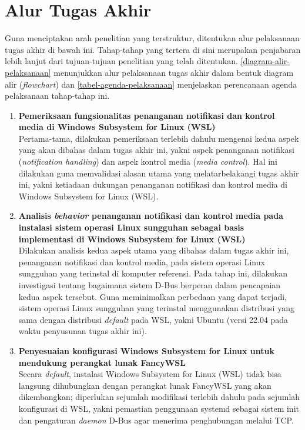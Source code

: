 \section{Alur Tugas Akhir}

Guna menciptakan arah penelitian yang terstruktur, ditentukan alur pelaksanaan tugas akhir di bawah ini. Tahap-tahap yang tertera di sini merupakan penjabaran lebih lanjut dari tujuan-tujuan penelitian yang telah ditentukan. \autoref{diagram-alir-pelaksanaan} menunjukkan alur pelaksanaan tugas akhir dalam bentuk diagram alir (\textit{flowchart}) dan \autoref{tabel-agenda-pelaksanaan} menjelaskan perencanaan agenda pelaksanaan tahap-tahap ini.

\begin{enumerate}
    \item \textbf{Pemeriksaan fungsionalitas penanganan notifikasi dan kontrol media di Windows Subsystem for Linux (WSL)}\\
    Pertama-tama, dilakukan pemeriksaan terlebih dahulu mengenai kedua aspek yang akan dibahas dalam tugas akhir ini, yakni aspek penanganan notifikasi (\textit{notification handling}) dan aspek kontrol media (\textit{media control}). Hal ini dilakukan guna memvalidasi alasan utama yang melatarbelakangi tugas akhir ini, yakni ketiadaan dukungan penanganan notifikasi dan kontrol media di Windows Subsystem for Linux (WSL).

    \item \textbf{Analisis \textit{behavior} penanganan notifikasi dan kontrol media pada instalasi sistem operasi Linux sungguhan sebagai basis implementasi di Windows Subsystem for Linux (WSL)}\\
    Dilakukan analisis kedua aspek utama yang dibahas dalam tugas akhir ini, penanganan notifikasi dan kontrol media, pada sistem operasi Linux sungguhan yang terinstal di komputer referensi. Pada tahap ini, dilakukan investigasi tentang bagaimana sistem D-Bus berperan dalam pencapaian kedua aspek tersebut. Guna meminimalkan perbedaan yang dapat terjadi, sistem operasi Linux sungguhan yang terinstal menggunakan distribusi yang sama dengan distribusi \textit{default} pada WSL, yakni Ubuntu (versi 22.04 pada waktu penyusunan tugas akhir ini).

    \item \textbf{Penyesuaian konfigurasi Windows Subsystem for Linux untuk mendukung perangkat lunak FancyWSL}\\
    Secara \textit{default}, instalasi Windows Subsystem for Linux (WSL) tidak bisa langsung dihubungkan dengan perangkat lunak FancyWSL yang akan dikembangkan; diperlukan sejumlah modifikasi terlebih dahulu pada sejumlah konfigurasi di WSL, yakni pemastian penggunaan systemd sebagai sistem init dan pengaturan \textit{daemon} D-Bus agar menerima penghubungan melalui TCP.


\end{enumerate}

